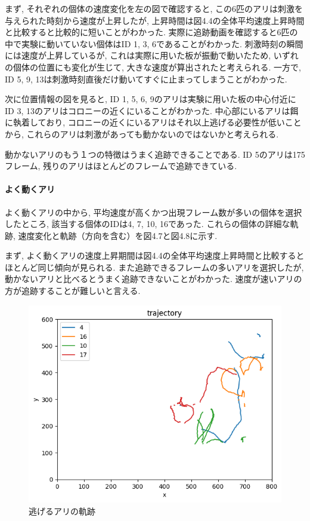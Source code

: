 ﻿\documentclass[a4paper, 12pt]{jsreport}
\begin{document}
まず, それぞれの個体の速度変化を左の図で確認すると, この6匹のアリは刺激を与えられた時刻から速度が上昇したが, 上昇時間は図4.4の全体平均速度上昇時間と比較すると比較的に短いことがわかった. 実際に追跡動画を確認すると6匹の中で実験に動いていない個体はID 1,  3,  6であることがわかった. 刺激時刻の瞬間には速度が上昇しているが, これは実際に用いた板が振動で動いたため,  いずれの個体の位置にも変化が生じて,  大きな速度が算出されたと考えられる. 一方で,  ID 5,  9,  13は刺激時刻直後だけ動いてすぐに止まってしまうことがわかった. 

次に位置情報の図を見ると,  ID 1,  5,  6,  9のアリは実験に用いた板の中心付近にID 3,  13のアリはコロニーの近くにいることがわかった. 中心部にいるアリは餌に執着しており,  コロニーの近くにいるアリはそれ以上逃げる必要性が低いことから, これらのアリは刺激があっても動かないのではないかと考えられる. 

動かないアリのもう１つの特徴はうまく追跡できることである. ID 5のアリは175フレーム, 残りのアリはほとんどのフレームで追跡できている. 
\paragraph{よく動くアリ}
よく動くアリの中から,  平均速度が高くかつ出現フレーム数が多いの個体を選択したところ,  該当する個体のIDは4,  7,  10,  16であった. これらの個体の詳細な軌跡, 速度変化と軌跡（方向を含む）を図4.7と図4.8に示す. 

まず, よく動くアリの速度上昇期間は図4.4の全体平均速度上昇時間と比較するとほとんど同じ傾向が見られる. 
また追跡できるフレームの多いアリを選択したが,動かないアリと比べるとうまく追跡できないことがわかった. 速度が速いアリの方が追跡することが難しいと言える. 
\begin{figure}[tbp]
\centering
\includegraphics[width=13cm,  keepaspectratio]{traject_nige.png}
\caption[Short figure caption for List of Figures]{逃げるアリの軌跡}
\label{fig:paper1_fig14}
\end{figure}
\end{document}
